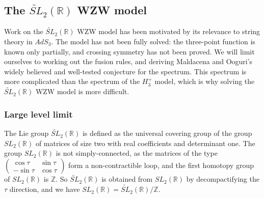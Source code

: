 \documentclass[12pt, a4paper, notitlepage, twoside]{report}
\numberwithin{equation}{section}
\theoremstyle{break}
\begin{document}
\subsection{The \texorpdfstring{$\widetilde{SL}_2(\mathbb{R})$}{SL2(R)} WZW model \label{secslr}}

Work on the $\widetilde{SL}_2(\mathbb{R})$ WZW model has been motivated by its relevance to string theory in $AdS_3$.
The model has not been fully solved: the three-point function is known only partially, and crossing symmetry has not been proved.
We will limit ourselves to working out the fusion rules, and deriving Maldacena and Ooguri's widely believed and well-tested conjecture for the spectrum.
This spectrum is more complicated than the spectrum of the $H_3^+$ model, which is why solving the $\widetilde{SL}_2(\mathbb{R})$ WZW model is more difficult.

\subsubsection{Large level limit}

The Lie group \textbf{\boldmath $\widetilde{SL}_2(\mathbb{R})$} is defined as the universal covering group of the group $SL_2({\mathbb{R}})$ of matrices of size two with real coefficients and determinant one.
The group $SL_2({\mathbb{R}})$ is not simply-connected, as the matrices of the type $\left(\begin{smallmatrix} \cos \tau & \sin\tau \\ -\sin\tau & \cos \tau \end{smallmatrix}\right)$ form a non-contractible loop, and the first homotopy group of $SL_2({\mathbb{R}})$ is ${\mathbb{Z}}$.
So $\widetilde{SL}_2(\mathbb{R})$ is obtained from $SL_2({\mathbb{R}})$ by decompactifying the $\tau$ direction, and we have $SL_2({\mathbb{R}}) = \widetilde{SL}_2(\mathbb{R})/{\mathbb{Z}}$.
\end{document}
